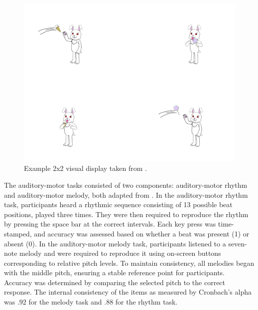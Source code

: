 \begin{figure}
    \centering
    \includegraphics[width=\textwidth,height=\textheight,keepaspectratio]{viz/Fig1-Geetal.jpg}
    \caption{Example 2x2 visual display taken from \textcite{ge2021a}.}
    \label{fig:sampleslide}
\end{figure}


The auditory-motor tasks consisted of two components: auditory-motor rhythm and auditory-motor melody, both adapted from \textcite{Kachlicka_Saito_Tierney_2019}. In the auditory-motor rhythm task, participants heard a rhythmic sequence consisting of 13 possible beat positions, played three times. They were then required to reproduce the rhythm by pressing the space bar at the correct intervals. Each key press was time-stamped, and accuracy was assessed based on whether a beat was present (1) or absent (0). In the auditory-motor melody task, participants listened to a seven-note melody and were required to reproduce it using on-screen buttons corresponding to relative pitch levels. To maintain consistency, all melodies began with the middle pitch, ensuring a stable reference point for participants. Accuracy was determined by comparing the selected pitch to the correct response. The internal consistency of the items as measured by Cronbach's alpha was .92 for the melody task and .88 for the rhythm task.

